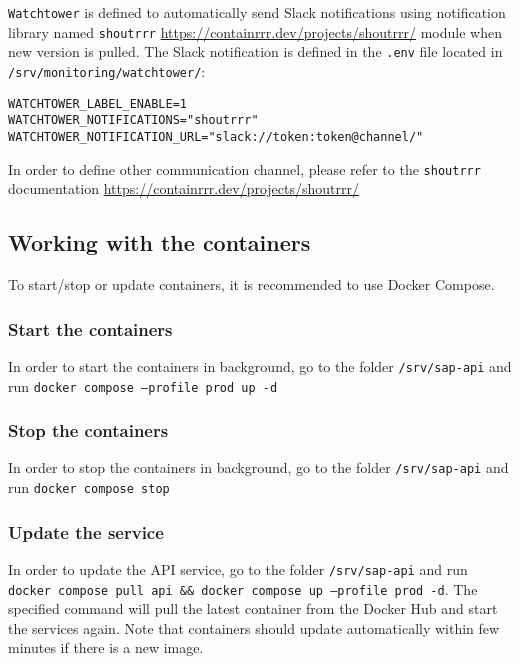 \texttt{Watchtower} is defined to automatically send Slack notifications using notification library named \texttt{shoutrrr} \url{https://containrrr.dev/projects/shoutrrr/} module when new version is pulled. The Slack notification is defined in the \texttt{.env} file located in \texttt{/srv/monitoring/watchtower/}:
\begin{lstlisting}[caption={Watchtower environment variables}]
WATCHTOWER_LABEL_ENABLE=1
WATCHTOWER_NOTIFICATIONS="shoutrrr"
WATCHTOWER_NOTIFICATION_URL="slack://token:token@channel/"
\end{lstlisting}
In order to define other communication channel, please refer to the \texttt{shoutrrr} documentation \url{https://containrrr.dev/projects/shoutrrr/}

\subsection{Working with the containers}
To start/stop or update containers, it is recommended to use Docker Compose.
\subsubsection{Start the containers}
In order to start the containers in background, go to the folder \texttt{/srv/sap-api} and run \texttt{docker compose --profile prod up -d}

\subsubsection{Stop the containers}
In order to stop the containers in background, go to the folder \texttt{/srv/sap-api} and run \texttt{docker compose stop}

\subsubsection{Update the service}
In order to update the API service, go to the folder \texttt{/srv/sap-api} and run \texttt{docker compose pull api \&\& docker compose up --profile prod -d}.
The specified command will pull the latest container from the Docker Hub and start the services again.
Note that containers should update automatically 
within few minutes if there is a new image.



